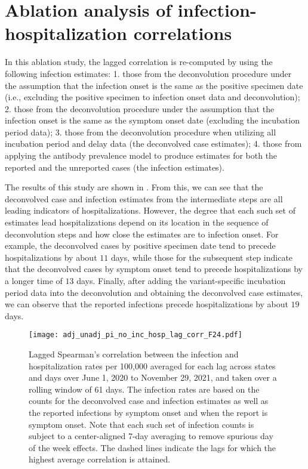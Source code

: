 \section{Ablation analysis of infection-hospitalization correlations}
\label{sec:ablation}
In this ablation study, the lagged correlation is re-computed by
using the following infection estimates: 1. those from
the deconvolution procedure under the assumption that the infection onset is the
same as the positive specimen date (i.e., excluding the positive specimen to
infection onset data and deconvolution); 2. those from the deconvolution
procedure under the assumption that the infection onset is the same as the
symptom onset date (excluding the incubation period data); 3. those from the
deconvolution procedure when utilizing all incubation period and delay data (the
deconvolved case estimates); 4. those from applying the antibody prevalence
model to produce estimates for both the reported and the unreported cases (the
infection estimates).

The results of this study are shown in . From
this, we can see that the deconvolved case and infection estimates from the
intermediate steps are all leading indicators of hospitalizations. However, the
degree that each such set of estimates lead hospitalizations depend on its
location in the sequence of deconvolution steps and how close the estimates are to infection
onset. For example, the deconvolved cases by positive specimen date tend to
precede hospitalizations by about $11$ days, while those for the subsequent step
indicate that the deconvolved cases by symptom onset tend to precede
hospitalizations by a longer time of $13$ days. Finally, after adding the
variant-specific incubation period data into the deconvolution and obtaining the
deconvolved case estimates, we can observe that the reported infections precede
hospitalizations by about $19$ days. 

\begin{figure}[H]
\centering
     \texttt{[image: adj\_unadj\_pi\_no\_inc\_hosp\_lag\_corr\_F24.pdf]} 
     \caption{Lagged Spearman's correlation between the infection and
     hospitalization rates per 100,000 averaged for each lag across \US states
     and days over June 1, 2020 to November 29, 2021, and taken over a rolling
     window of 61 days. The infection rates are based on the counts for the
     deconvolved case and infection estimates as well as the reported infections
     by symptom onset and when the report is symptom onset. Note that each such
     set of infection counts is subject to a center-aligned 7-day averaging to
     remove spurious day of the week effects. The dashed lines indicate the lags
     for which the highest average correlation is attained.}
     \label{fig:abl-lag-cor}
 \end{figure}
 